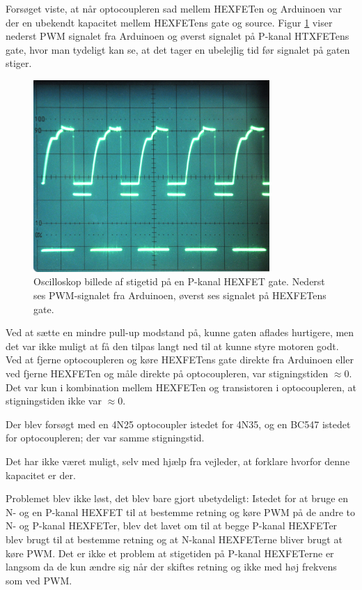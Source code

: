 \documentclass[a4paper,11pt,oneside,article,danish,table]{memoir}
\begin{document}

Forsøget viste, at når optocoupleren sad mellem HEXFETen og Arduinoen var der en ubekendt kapacitet mellem HEXFETens gate og source. Figur \ref{fig:stigetid} viser nederst PWM signalet fra Arduinoen og øverst signalet på P-kanal HTXFETens gate, hvor man tydeligt kan se, at det tager en ubelejlig tid før signalet på gaten stiger.
\begin{figure}[htbp]
  \centering
  \includegraphics[width=0.8\textwidth]{pictures/stigetid.jpg}
  \caption[Oscilloskop billede af stigetid på en P-kanal HEXFET gate]{Oscilloskop billede af stigetid på en P-kanal HEXFET gate. Nederst ses PWM-signalet fra Arduinoen, øverst ses signalet på HEXFETens gate.}
  \label{fig:stigetid}
\end{figure}

Ved at sætte en mindre pull-up modstand på, kunne gaten aflades hurtigere, men det var ikke muligt at få den tilpas langt ned til at kunne styre motoren godt. Ved at fjerne optocoupleren og køre HEXFETens gate direkte fra Arduinoen eller ved fjerne HEXFETen og måle direkte på optocoupleren, var stigningstiden $\approx0$. Det var kun i kombination mellem HEXFETen og transistoren i optocoupleren, at stigningstiden ikke var $\approx0$.

Der blev forsøgt med en 4N25 optocoupler istedet for 4N35, og en BC547 istedet for optocoupleren; der var samme stigningstid.

Det har ikke været muligt, selv med hjælp fra vejleder, at forklare hvorfor denne kapacitet er der.

Problemet blev ikke løst, det blev bare gjort ubetydeligt: Istedet for at bruge en N- og en P-kanal HEXFET til at bestemme retning og køre PWM på de andre to N- og P-kanal HEXFETer, blev det lavet om til at begge P-kanal HEXFETer blev brugt til at bestemme retning og at N-kanal HEXFETerne bliver brugt at køre PWM. Det er ikke et problem at stigetiden på P-kanal HEXFETerne er langsom da de kun ændre sig når der skiftes retning og ikke med høj frekvens som ved PWM.
\end{document}
